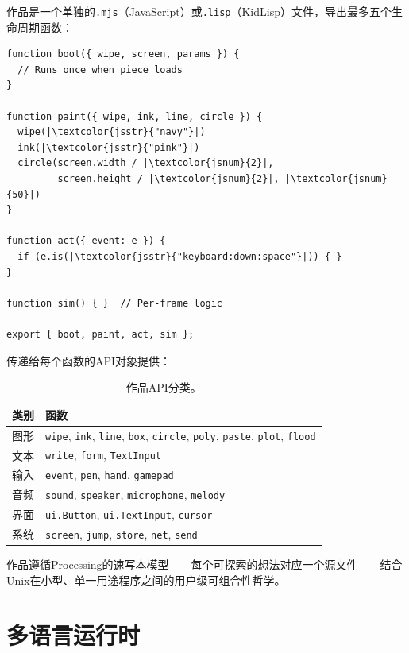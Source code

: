 \documentclass[10pt,letterpaper,twocolumn]{article}
\begin{document}
作品是一个单独的\texttt{.mjs}（JavaScript）或\texttt{.lisp}（KidLisp）文件，导出最多五个生命周期函数：

\begin{lstlisting}[style=acjsstyle]
function boot({ wipe, screen, params }) {
  // Runs once when piece loads
}

function paint({ wipe, ink, line, circle }) {
  wipe(|\textcolor{jsstr}{"navy"}|)
  ink(|\textcolor{jsstr}{"pink"}|)
  circle(screen.width / |\textcolor{jsnum}{2}|,
         screen.height / |\textcolor{jsnum}{2}|, |\textcolor{jsnum}{50}|)
}

function act({ event: e }) {
  if (e.is(|\textcolor{jsstr}{"keyboard:down:space"}|)) { }
}

function sim() { }  // Per-frame logic

export { boot, paint, act, sim };
\end{lstlisting}

传递给每个函数的API对象提供：

\begin{table}[h]
\small
\centering
\begin{tabularx}{\columnwidth}{lX}
\toprule
\textbf{类别} & \textbf{函数} \\
\midrule
图形 & \texttt{wipe}, \texttt{ink}, \texttt{line}, \texttt{box}, \texttt{circle}, \texttt{poly}, \texttt{paste}, \texttt{plot}, \texttt{flood} \\
文本 & \texttt{write}, \texttt{form}, \texttt{TextInput} \\
输入 & \texttt{event}, \texttt{pen}, \texttt{hand}, \texttt{gamepad} \\
音频 & \texttt{sound}, \texttt{speaker}, \texttt{microphone}, \texttt{melody} \\
界面 & \texttt{ui.Button}, \texttt{ui.TextInput}, \texttt{cursor} \\
系统 & \texttt{screen}, \texttt{jump}, \texttt{store}, \texttt{net}, \texttt{send} \\
\bottomrule
\end{tabularx}
\caption{作品API分类。}
\label{tab:api}
\end{table}

作品遵循Processing的速写本模型——每个可探索的想法对应一个源文件——结合Unix在小型、单一用途程序之间的用户级可组合性哲学。


\section{多语言运行时}
\label{sec:languages}
\end{document}
